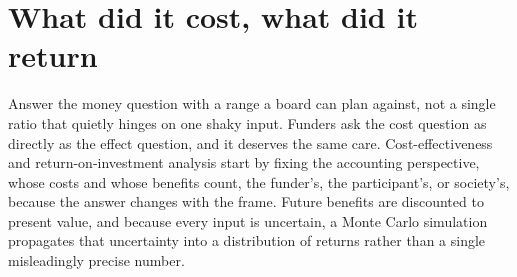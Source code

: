 \documentclass[
    a4paper,
    fontsize=10pt,
    twoside=true,
    numbers=noenddot,
]{kaobook}
\begin{document}
\section{What did it cost, what did it return}\label{sec:roi}
Answer the money question with a range a board can plan against, not a single ratio that quietly hinges on one shaky input. Funders ask the cost question as directly as the effect question, and it deserves the same care. Cost-effectiveness and return-on-investment analysis start by fixing the accounting perspective, whose costs and whose benefits count, the funder's, the participant's, or society's, because the answer changes with the frame. Future benefits are discounted to present value, and because every input is uncertain, a Monte Carlo simulation propagates that uncertainty into a distribution of returns rather than a single misleadingly precise number.
\end{document}
